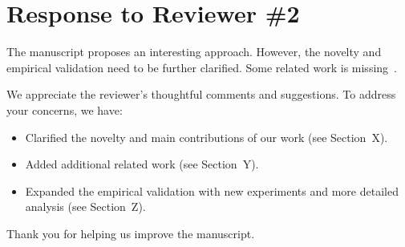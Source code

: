 \section*{Response to Reviewer \#2}
\setcounter{commentcounter}{0}

\begin{generalcomment}
The manuscript proposes an interesting approach. However, the novelty and empirical validation need to be further clarified. Some related work is missing~\cite{smith2023}.
\end{generalcomment}

\begin{generalresponse}
We appreciate the reviewer’s thoughtful comments and suggestions. To address your concerns, we have:
\begin{itemize}
    \item Clarified the novelty and main contributions of our work (see Section~X).
    \item Added additional related work (see Section~Y).
    \item Expanded the empirical validation with new experiments and more detailed analysis (see Section~Z).
\end{itemize}
Thank you for helping us improve the manuscript.
\end{generalresponse}


